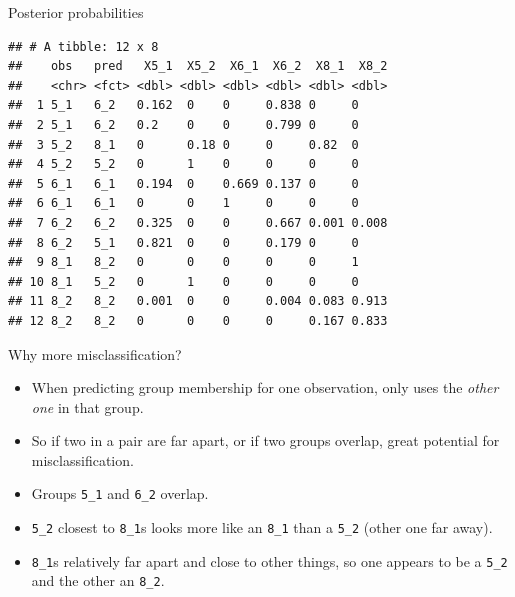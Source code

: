 \documentclass[
  ignorenonframetext,
]{beamer}
\newenvironment{Shaded}{\begin{snugshade}}{\end{snugshade}}
\newcommand{\DataTypeTok}[1]{\textcolor[rgb]{0.13,0.29,0.53}{#1}}
\newcommand{\DecValTok}[1]{\textcolor[rgb]{0.00,0.00,0.81}{#1}}
\newcommand{\KeywordTok}[1]{\textcolor[rgb]{0.13,0.29,0.53}{\textbf{#1}}}
\newcommand{\NormalTok}[1]{#1}
\newcommand{\OperatorTok}[1]{\textcolor[rgb]{0.81,0.36,0.00}{\textbf{#1}}}
\newcommand{\StringTok}[1]{\textcolor[rgb]{0.31,0.60,0.02}{#1}}
\begin{document}
\begin{frame}[fragile]{Posterior probabilities}
\protect\hypertarget{posterior-probabilities-2}{}

\footnotesize

\begin{Shaded}
\end{Shaded}

\begin{verbatim}
## # A tibble: 12 x 8
##    obs   pred   X5_1  X5_2  X6_1  X6_2  X8_1  X8_2
##    <chr> <fct> <dbl> <dbl> <dbl> <dbl> <dbl> <dbl>
##  1 5_1   6_2   0.162  0    0     0.838 0     0    
##  2 5_1   6_2   0.2    0    0     0.799 0     0    
##  3 5_2   8_1   0      0.18 0     0     0.82  0    
##  4 5_2   5_2   0      1    0     0     0     0    
##  5 6_1   6_1   0.194  0    0.669 0.137 0     0    
##  6 6_1   6_1   0      0    1     0     0     0    
##  7 6_2   6_2   0.325  0    0     0.667 0.001 0.008
##  8 6_2   5_1   0.821  0    0     0.179 0     0    
##  9 8_1   8_2   0      0    0     0     0     1    
## 10 8_1   5_2   0      1    0     0     0     0    
## 11 8_2   8_2   0.001  0    0     0.004 0.083 0.913
## 12 8_2   8_2   0      0    0     0     0.167 0.833
\end{verbatim}

\normalsize

\end{frame}

\begin{frame}[fragile]{Why more misclassification?}
\protect\hypertarget{why-more-misclassification}{}

\begin{itemize}
\item
  When predicting group membership for one observation, only uses the
  \emph{other one} in that group.
\item
  So if two in a pair are far apart, or if two groups overlap, great
  potential for misclassification.
\item
  Groups \texttt{5\_1} and \texttt{6\_2} overlap.
\item
  \texttt{5\_2} closest to \texttt{8\_1}s looks more like an
  \texttt{8\_1} than a \texttt{5\_2} (other one far away).
\item
  \texttt{8\_1}s relatively far apart and close to other things, so one
  appears to be a \texttt{5\_2} and the other an \texttt{8\_2}.
\end{itemize}

\end{frame}
\end{document}
